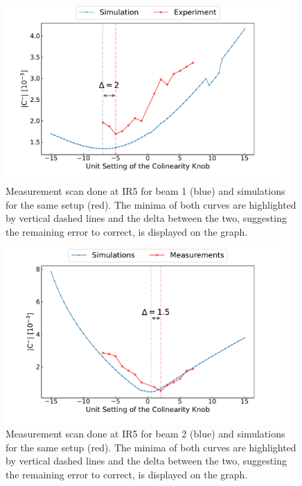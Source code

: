 \begin{figure}[!htb]
    \centering
    \includegraphics*[width=0.94\textwidth]{Figures/IR_Coupling_Correction/rws_measurement_ir5_b1_pos.pdf}
    \caption{Measurement scan done at IR\num{5} for beam \num{1} (\textcolor{mplblue}{blue}) and simulations for the same setup (\textcolor{mplr}{red}). The minima of both curves are highlighted by vertical dashed lines and the delta between the two, suggesting the remaining error to correct, is displayed on the graph.}
    \label{figure:ir5_b1_pos_measurement}
\end{figure}

\begin{figure}[!htb]
    \centering
    \includegraphics*[width=0.94\textwidth]{Figures/IR_Coupling_Correction/rws_measurement_ir5_b2_pos.pdf}
    \caption{Measurement scan done at IR\num{5} for beam \num{2} (\textcolor{mplblue}{blue}) and simulations for the same setup (\textcolor{mplr}{red}). The minima of both curves are highlighted by vertical dashed lines and the delta between the two, suggesting the remaining error to correct, is displayed on the graph.}
    \label{figure:ir5_b2_pos_measurement}
\end{figure}

